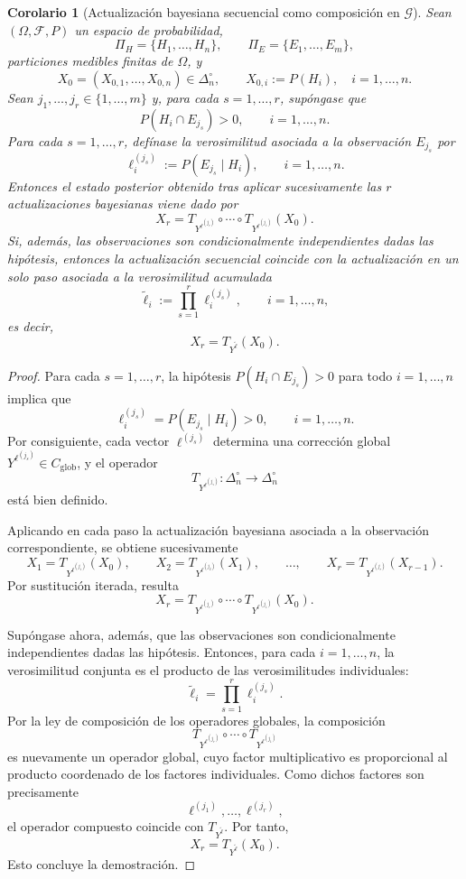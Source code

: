 ﻿\documentclass[12pt]{article}
\newtheorem{corolario}{Corolario}[section]
\begin{document}

\begin{corolario}[Actualización bayesiana secuencial como composición en $\mathcal G$]\label{cor:bayes_secuencial}
Sean $(\Omega,\mathcal F,P)$ un espacio de probabilidad,
\[
\Pi_H=\{H_1,\dots,H_n\},
\qquad
\Pi_E=\{E_1,\dots,E_m\},
\]
particiones medibles finitas de $\Omega$, y
\[
X_0=(X_{0,1},\dots,X_{0,n})\in\Delta_n^\circ,
\qquad
X_{0,i}:=P(H_i),\quad i=1,\dots,n.
\]
Sean $j_1,\dots,j_r\in\{1,\dots,m\}$ y, para cada $s=1,\dots,r$, supóngase que
\[
P(H_i\cap E_{j_s})>0,\qquad i=1,\dots,n.
\]
Para cada $s=1,\dots,r$, defínase la verosimilitud asociada a la observación $E_{j_s}$ por
\[
\ell_i^{(j_s)}:=P(E_{j_s}\mid H_i),\qquad i=1,\dots,n.
\]
Entonces el estado posterior obtenido tras aplicar sucesivamente las $r$ actualizaciones bayesianas viene dado por
\[
X_r=
T_{Y^{\ell^{(j_r)}}}\circ\cdots\circ T_{Y^{\ell^{(j_1)}}}(X_0).
\]
Si, además, las observaciones son condicionalmente independientes dadas las hipótesis, entonces la actualización secuencial coincide con la actualización en un solo paso asociada a la verosimilitud acumulada
\[
\widetilde{\ell}_i:=\prod_{s=1}^r \ell_i^{(j_s)},
\qquad i=1,\dots,n,
\]
es decir,
\[
X_r=T_{Y^{\widetilde{\ell}}}(X_0).
\]
\end{corolario}

\begin{proof}
Para cada $s=1,\dots,r$, la hipótesis $P(H_i\cap E_{j_s})>0$ para todo $i=1,\dots,n$ implica que
\[
\ell_i^{(j_s)}=P(E_{j_s}\mid H_i)>0,\qquad i=1,\dots,n.
\]
Por consiguiente, cada vector $\ell^{(j_s)}$ determina una corrección global $Y^{\ell^{(j_s)}}\in C_{\mathrm{glob}}$, y el operador
\[
T_{Y^{\ell^{(j_s)}}}:\Delta_n^\circ\to\Delta_n^\circ
\]
está bien definido.

Aplicando en cada paso la actualización bayesiana asociada a la observación correspondiente, se obtiene sucesivamente
\[
X_1=T_{Y^{\ell^{(j_1)}}}(X_0),\qquad
X_2=T_{Y^{\ell^{(j_2)}}}(X_1),\qquad \dots,\qquad
X_r=T_{Y^{\ell^{(j_r)}}}(X_{r-1}).
\]
Por sustitución iterada, resulta
\[
X_r=
T_{Y^{\ell^{(j_r)}}}\circ\cdots\circ T_{Y^{\ell^{(j_1)}}}(X_0).
\]

Supóngase ahora, además, que las observaciones son condicionalmente independientes dadas las hipótesis. Entonces, para cada $i=1,\dots,n$, la verosimilitud conjunta es el producto de las verosimilitudes individuales:
\[
\widetilde{\ell}_i=\prod_{s=1}^r \ell_i^{(j_s)}.
\]
Por la ley de composición de los operadores globales, la composición
\[
T_{Y^{\ell^{(j_r)}}}\circ\cdots\circ T_{Y^{\ell^{(j_1)}}}
\]
es nuevamente un operador global, cuyo factor multiplicativo es proporcional al producto coordenado de los factores individuales. Como dichos factores son precisamente
\[
\ell^{(j_1)},\dots,\ell^{(j_r)},
\]
el operador compuesto coincide con $T_{Y^{\widetilde{\ell}}}$. Por tanto,
\[
X_r=T_{Y^{\widetilde{\ell}}}(X_0).
\]
Esto concluye la demostración.
\end{proof}
\end{document}
